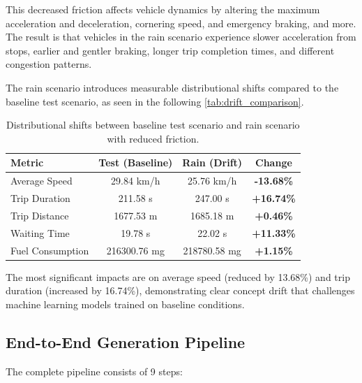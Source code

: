 This decreased friction affects vehicle dynamics by altering the maximum acceleration and deceleration, cornering speed, and emergency braking, and more.
The result is that vehicles in the rain scenario experience slower acceleration from stops, earlier and gentler braking, longer trip completion times, and different congestion patterns.

The rain scenario introduces measurable distributional shifts compared to the baseline test scenario, as seen in the following \autoref{tab:drift_comparison}.

\begin{table}[t]
    \centering
    \caption{Distributional shifts between baseline test scenario and rain scenario with reduced friction.}
    \label{tab:drift_comparison}
    \vspace{0.5em}
    \begin{tabular}{lccc}
        \toprule
        \textbf{Metric} & \textbf{Test (Baseline)} & \textbf{Rain (Drift)} & \textbf{Change} \\
        \midrule
        Average Speed & 29.84 km/h & 25.76 km/h & \textbf{-13.68\%} \\
        Trip Duration & 211.58 s & 247.00 s & \textbf{+16.74\%} \\
        Trip Distance & 1677.53 m & 1685.18 m & \textbf{+0.46\%} \\
        Waiting Time & 19.78 s & 22.02 s & \textbf{+11.33\%} \\
        Fuel Consumption & 216300.76 mg & 218780.58 mg & \textbf{+1.15\%} \\
        \bottomrule
    \end{tabular}
\end{table}

The most significant impacts are on average speed (reduced by 13.68\%) and trip duration (increased by 16.74\%), demonstrating clear concept drift that challenges machine learning models trained on baseline conditions.

\subsection{End-to-End Generation Pipeline}
The complete pipeline consists of 9 steps:

